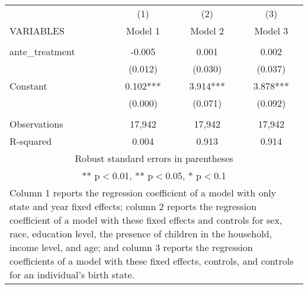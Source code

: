 \begin{tabular}{lccc}
\hline
 & (1) & (2) & (3) \\
VARIABLES & Model 1 & Model 2 & Model 3 \\ \hline
 &  &  &  \\
ante\_treatment & -0.005 & 0.001 & 0.002 \\
 & (0.012) & (0.030) & (0.037) \\
Constant & 0.102*** & 3.914*** & 3.878*** \\
 & (0.000) & (0.071) & (0.092) \\
 &  &  &  \\
Observations & 17,942 & 17,942 & 17,942 \\
 R-squared & 0.004 & 0.913 & 0.914 \\ \hline
\multicolumn{4}{c}{\small Robust standard errors in parentheses} \\
\multicolumn{4}{c}{\small *** p$<$0.01, ** p$<$0.05, * p$<$0.1} \\
\multicolumn{4}{p{0.8\linewidth}}{\small Column 1 reports the
regression coefficient of a model with only state and year fixed effects; column 2 reports the
regression coefficient of a model with these fixed effects and controls for sex, race, education
level, the presence of children in the household, income level, and age; and column 3 reports
the regression coefficients of a model with these fixed effects, controls, and controls for an
individual’s birth state.} \\
\end{tabular}
